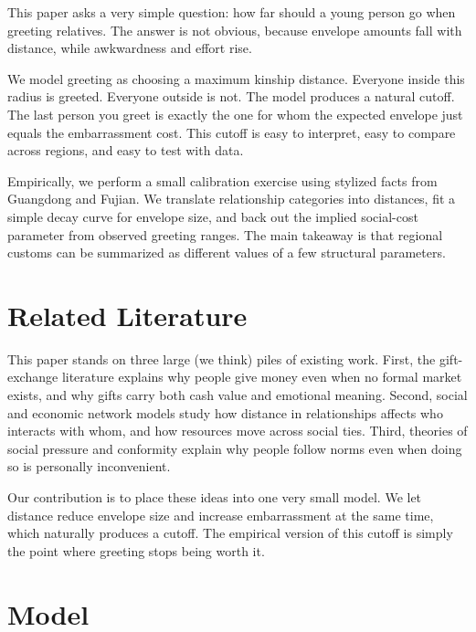 \documentclass[AER]{AEA}
\begin{document}
This paper asks a very simple question: how far should a young person go when greeting relatives. The answer is not obvious, because envelope amounts fall with distance, while awkwardness and effort rise. 

We model greeting as choosing a maximum kinship distance. Everyone inside this radius is greeted. Everyone outside is not. The model produces a natural cutoff. The last person you greet is exactly the one for whom the expected envelope just equals the embarrassment cost. This cutoff is easy to interpret, easy to compare across regions, and easy to test with data. 

Empirically, we perform a small calibration exercise using stylized facts from Guangdong and Fujian. We translate relationship categories into distances, fit a simple decay curve for envelope size, and back out the implied social-cost parameter from observed greeting ranges. The main takeaway is that regional customs can be summarized as different values of a few structural parameters.

\section{Related Literature}

This paper stands on three large (we think) piles of existing work. First, the gift-exchange literature explains why people give money even when no formal market exists, and why gifts carry both cash value and emotional meaning. Second, social and economic network models study how distance in relationships affects who interacts with whom, and how resources move across social ties. Third, theories of social pressure and conformity explain why people follow norms even when doing so is personally inconvenient. 

Our contribution is to place these ideas into one very small model. We let distance reduce envelope size and increase embarrassment at the same time, which naturally produces a cutoff. The empirical version of this cutoff is simply the point where greeting stops being worth it.

\section{Model}
\end{document}
